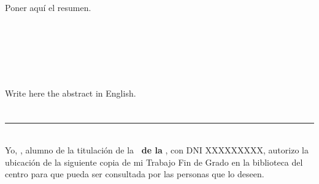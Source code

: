 \chapter*{}


\cleardoublepage
\thispagestyle{empty}

\begin{center}
{\large\bfseries \titulo}\\
\end{center}
\begin{center}
\autor\\
\end{center}

\\

\vspace{0.7cm}
\\

Poner aquí el resumen.
\cleardoublepage

\thispagestyle{empty}

\begin{center}
{\large\bfseries \tituloEng}\\
\end{center}
\begin{center}
\autor\\
\end{center}

\\

\vspace{0.7cm}
\\

Write here the abstract in English.

\chapter*{}
\thispagestyle{empty}

\noindent\rule[-1ex]{\textwidth}{2pt}\\[4.5ex]

Yo, \textbf{\autor}, alumno de la titulación \titulacion de la \textbf{\escuela\ de la \universidad}, con DNI XXXXXXXXX, 
autorizo la ubicación de la siguiente copia de mi Trabajo Fin de Grado en la biblioteca del centro para que pueda ser
consultada por las personas que lo deseen.

